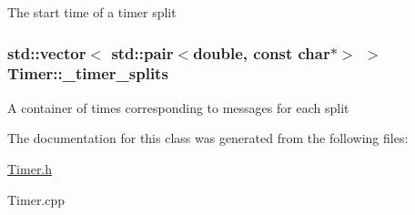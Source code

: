 The start time of a timer split \hypertarget{classTimer_a92ba53954cd01cbd9afe2e397e529d35}{
\subsubsection[{\-\_\-timer\-\_\-splits}]{\setlength{\rightskip}{0pt plus 5cm}std\-::vector$<$ std\-::pair$<$double, const char$\ast$$>$ $>$ Timer\-::\-\_\-timer\-\_\-splits\hspace{0.3cm}{\ttfamily [protected]}}}\label{classTimer_a92ba53954cd01cbd9afe2e397e529d35}
A container of times corresponding to messages for each split 

The documentation for this class was generated from the following files\-:\begin{DoxyCompactItemize}
\item 
\hyperlink{Timer_8h}{Timer.\-h}\item 
Timer.\-cpp\end{DoxyCompactItemize}
